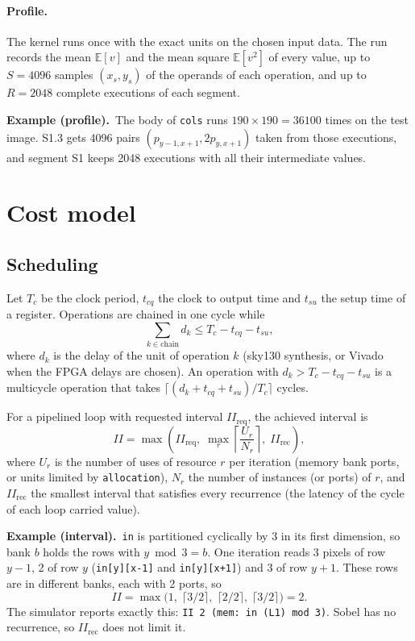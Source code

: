 \documentclass[11pt,a4paper]{article}
\newcommand{\E}{\mathbb{E}}
\newcommand{\examplebox}[2]{\par\medskip\noindent\colorbox{tabAzul!6}{\begin{minipage}{\dimexpr\linewidth-2\fboxsep}
  \textbf{Example (#1).}\ #2\end{minipage}}\par\medskip}
\begin{document}
\paragraph{Profile.} The kernel runs once with the exact units on the chosen input data. The run records the mean
$\E[v]$ and the mean square $\E[v^2]$ of every value, up to $S = 4096$ samples $(x_s, y_s)$ of the operands of each
operation, and up to $R = 2048$ complete executions of each segment.

\examplebox{profile}{The body of \texttt{cols} runs $190 \times 190 = 36100$ times on the test image. S1.3 gets 4096
pairs $(p_{y-1,x+1}, 2p_{y,x+1})$ taken from those executions, and segment S1 keeps 2048 executions with all their
intermediate values.}

\section{Cost model}\label{sec:cost}

\subsection{Scheduling}

Let $T_c$ be the clock period, $t_{cq}$ the clock to output time and $t_{su}$ the setup time of a register. Operations
are chained in one cycle while
\[
  \sum_{k \in \text{chain}} d_k \le T_c - t_{cq} - t_{su},
\]
where $d_k$ is the delay of the unit of operation $k$ (sky130 synthesis, or Vivado when the FPGA delays are chosen). An
operation with $d_k > T_c - t_{cq} - t_{su}$ is a multicycle operation that takes
$\lceil (d_k + t_{cq} + t_{su}) / T_c \rceil$ cycles.

For a pipelined loop with requested interval $II_{\text{req}}$, the achieved interval is
\[
  II = \max\left( II_{\text{req}},\; \max_{r} \left\lceil \frac{U_r}{N_r} \right\rceil,\; II_{\text{rec}} \right),
\]
where $U_r$ is the number of uses of resource $r$ per iteration (memory bank ports, or units limited by
\texttt{allocation}), $N_r$ the number of instances (or ports) of $r$, and $II_{\text{rec}}$ the smallest interval that
satisfies every recurrence (the latency of the cycle of each loop carried value).

\examplebox{interval}{\texttt{in} is partitioned cyclically by 3 in its first dimension, so bank $b$ holds the rows
with $y \bmod 3 = b$. One iteration reads 3 pixels of row $y-1$, 2 of row $y$ (\texttt{in[y][x-1]} and
\texttt{in[y][x+1]}) and 3 of row $y+1$. These rows are in different banks, each with 2 ports, so
\[
  II = \max\big(1,\; \lceil 3/2 \rceil,\; \lceil 2/2 \rceil,\; \lceil 3/2 \rceil\big) = 2 .
\]
The simulator reports exactly this: \texttt{II 2 (mem: in (L1) mod 3)}. Sobel has no recurrence, so
$II_{\text{rec}}$ does not limit it.}
\end{document}
